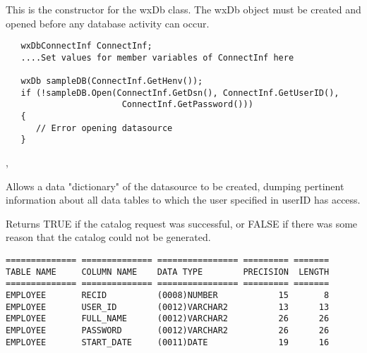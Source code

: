 


This is the constructor for the wxDb class.  The wxDb object must
be created and opened before any database activity can occur.


\begin{verbatim}
   wxDbConnectInf ConnectInf;
   ....Set values for member variables of ConnectInf here

   wxDb sampleDB(ConnectInf.GetHenv());
   if (!sampleDB.Open(ConnectInf.GetDsn(), ConnectInf.GetUserID(),
	                   ConnectInf.GetPassword()))
   {
      // Error opening datasource
   }
\end{verbatim}


,


\label{wxdbcatalog}


Allows a data "dictionary" of the datasource to be created, dumping pertinent 
information about all data tables to which the user specified in userID has 
access. 





Returns TRUE if the catalog request was successful, or FALSE if there was some 
reason that the catalog could not be generated.


\begin{verbatim}
============== ============== ================ ========= =======
TABLE NAME     COLUMN NAME    DATA TYPE        PRECISION  LENGTH
============== ============== ================ ========= =======
EMPLOYEE       RECID          (0008)NUMBER            15       8
EMPLOYEE       USER_ID        (0012)VARCHAR2          13      13
EMPLOYEE       FULL_NAME      (0012)VARCHAR2          26      26
EMPLOYEE       PASSWORD       (0012)VARCHAR2          26      26
EMPLOYEE       START_DATE     (0011)DATE              19      16
\end{verbatim}


